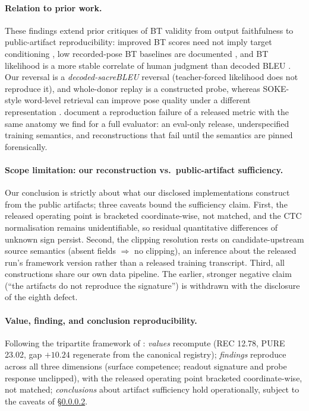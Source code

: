 \documentclass[pdflatex,sn-chicago]{sn-jnl}
\begin{document}
\paragraph{Relation to prior work.}
These findings extend prior critiques of BT validity from output faithfulness to public-artifact reproducibility: improved BT scores need not imply target conditioning \cite{hong2026conditional}, low recorded-pose BT baselines are documented \cite{walsh2024datadriven}, and BT likelihood is a more stable correlate of human judgment than decoded BLEU \cite{jiang2025meaningful}. Our reversal is a \emph{decoded-sacreBLEU} reversal (teacher-forced likelihood does not reproduce it), and whole-donor replay is a constructed probe, whereas SOKE-style word-level retrieval can improve pose quality under a different representation \cite{soke}. \citet{chen2022repro} document a reproduction failure of a released metric with the same anatomy we find for a full evaluator: an eval-only release, underspecified training semantics, and reconstructions that fail until the semantics are pinned forensically.

\paragraph{Scope limitation: our reconstruction vs.\ public-artifact sufficiency.}
\label{sec:scope_limit}
Our conclusion is strictly about what our disclosed implementations construct from the public artifacts; three caveats bound the sufficiency claim. First, the released operating point is bracketed coordinate-wise, not matched, and the CTC normalisation remains unidentifiable, so residual quantitative differences of unknown sign persist. Second, the clipping resolution rests on candidate-upstream source semantics (absent fields $\Rightarrow$ no clipping), an inference about the released run's framework version rather than a released training transcript. Third, all constructions share our own data pipeline. The earlier, stronger negative claim (``the artifacts do not reproduce the signature'') is withdrawn with the disclosure of the eighth defect.

\paragraph{Value, finding, and conclusion reproducibility.}
Following the tripartite framework of \cite{cohen2018three}: \emph{values} recompute (REC 12.78, PURE 23.02, gap $+10.24$ regenerate from the canonical registry); \emph{findings} reproduce across all three dimensions (surface competence; readout signature and probe response unclipped), with the released operating point bracketed coordinate-wise, not matched; \emph{conclusions} about artifact sufficiency hold operationally, subject to the caveats of \S\ref{sec:scope_limit}.
\end{document}
